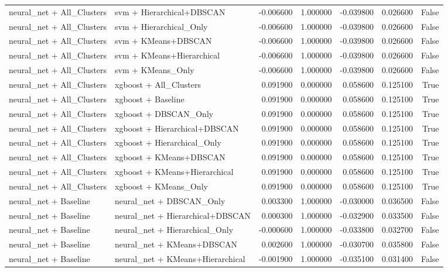 \begin{tabular}{llrrrrr}
neural_net + All_Clusters & svm + Hierarchical+DBSCAN & -0.006600 & 1.000000 & -0.039800 & 0.026600 & False \\
neural_net + All_Clusters & svm + Hierarchical_Only & -0.006600 & 1.000000 & -0.039800 & 0.026600 & False \\
neural_net + All_Clusters & svm + KMeans+DBSCAN & -0.006600 & 1.000000 & -0.039800 & 0.026600 & False \\
neural_net + All_Clusters & svm + KMeans+Hierarchical & -0.006600 & 1.000000 & -0.039800 & 0.026600 & False \\
neural_net + All_Clusters & svm + KMeans_Only & -0.006600 & 1.000000 & -0.039800 & 0.026600 & False \\
neural_net + All_Clusters & xgboost + All_Clusters & 0.091900 & 0.000000 & 0.058600 & 0.125100 & True \\
neural_net + All_Clusters & xgboost + Baseline & 0.091900 & 0.000000 & 0.058600 & 0.125100 & True \\
neural_net + All_Clusters & xgboost + DBSCAN_Only & 0.091900 & 0.000000 & 0.058600 & 0.125100 & True \\
neural_net + All_Clusters & xgboost + Hierarchical+DBSCAN & 0.091900 & 0.000000 & 0.058600 & 0.125100 & True \\
neural_net + All_Clusters & xgboost + Hierarchical_Only & 0.091900 & 0.000000 & 0.058600 & 0.125100 & True \\
neural_net + All_Clusters & xgboost + KMeans+DBSCAN & 0.091900 & 0.000000 & 0.058600 & 0.125100 & True \\
neural_net + All_Clusters & xgboost + KMeans+Hierarchical & 0.091900 & 0.000000 & 0.058600 & 0.125100 & True \\
neural_net + All_Clusters & xgboost + KMeans_Only & 0.091900 & 0.000000 & 0.058600 & 0.125100 & True \\
neural_net + Baseline & neural_net + DBSCAN_Only & 0.003300 & 1.000000 & -0.030000 & 0.036500 & False \\
neural_net + Baseline & neural_net + Hierarchical+DBSCAN & 0.000300 & 1.000000 & -0.032900 & 0.033500 & False \\
neural_net + Baseline & neural_net + Hierarchical_Only & -0.000600 & 1.000000 & -0.033800 & 0.032700 & False \\
neural_net + Baseline & neural_net + KMeans+DBSCAN & 0.002600 & 1.000000 & -0.030700 & 0.035800 & False \\
neural_net + Baseline & neural_net + KMeans+Hierarchical & -0.001900 & 1.000000 & -0.035100 & 0.031400 & False \\

\end{tabular}
